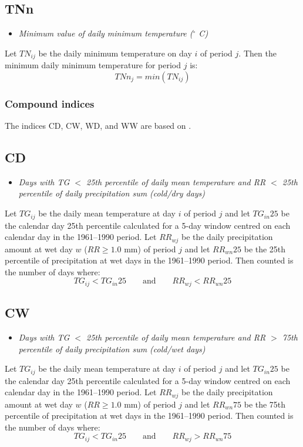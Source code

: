 \documentclass[a4paper,11pt]{article}
\begin{document}
\subsection*{TNn}
\begin{itemize}
\item \textit{Minimum value of daily minimum temperature ($^\circ$ C)}
\end{itemize}
Let $TN_{ij}$ be the daily minimum temperature on day $i$ of period
$j$. Then the minimum daily minimum temperature for period $j$ is:
\begin{equation*}
TNn_{j} = min(TN_{ij})
\end{equation*}

\subsubsection{Compound indices}

The indices CD, CW, WD, and WW are based on \citet{beniston}.

\subsection*{CD}
\begin{itemize}
\item \textit{Days with TG $<$ 25th percentile of daily mean temperature 
and RR $<$ 25th percentile of daily precipitation sum (cold/dry days)}
\end{itemize}
Let $TG_{ij}$ be the daily mean temperature at day $i$ of period $j$
and let $TG_{in}25$ be the calendar day 25th percentile calculated for
a 5-day window centred on each calendar day in the 1961--1990
period. Let $RR_{wj}$ be the daily precipitation amount at wet day $w$
($RR\geq1.0$ mm) of period $j$ and let $RR_{wn}25$ be the 25th
percentile of precipitation at wet days in the 1961--1990 period. Then
counted is the number of days where:
\begin{equation*}
TG_{ij} < TG_{in}25 \qquad \textrm{and} \qquad RR_{wj} < RR_{wn}25
\end{equation*}

\subsection*{CW}
\begin{itemize}
\item \textit{Days with TG $<$ 25th percentile of daily mean temperature
and RR $>$ 75th percentile of daily precipitation sum (cold/wet days)}
\end{itemize}
Let $TG_{ij}$ be the daily mean temperature at day $i$ of period $j$
and let $TG_{in}25$ be the calendar day 25th percentile calculated for
a 5-day window centred on each calendar day in the 1961--1990
period. Let $RR_{wj}$ be the daily precipitation amount at wet day $w$
($RR\geq1.0$ mm) of period $j$ and let $RR_{wn}75$ be the 75th
percentile of precipitation at wet days in the 1961--1990 period. Then
counted is the number of days where:
\begin{equation*}
TG_{ij} < TG_{in}25 \qquad \textrm{and} \qquad RR_{wj} > RR_{wn}75
\end{equation*}
\end{document}
